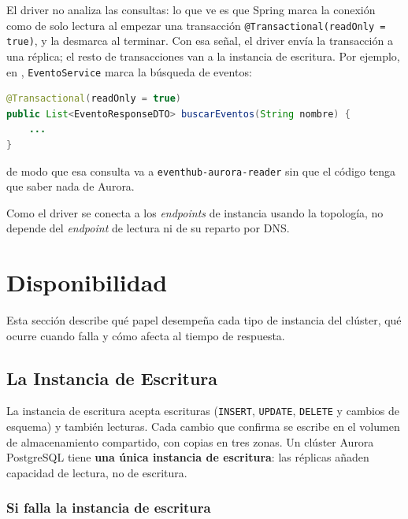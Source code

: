 \documentclass[12pt,a4paper]{article}
\begin{document}
El driver no analiza las consultas: lo que ve es que Spring marca la conexión como de solo lectura al empezar una transacción \texttt{@Transactional(readOnly = true)}, y la desmarca al terminar. Con esa señal, el driver envía la transacción a una réplica; el resto de transacciones van a la instancia de escritura. Por ejemplo, en \proyecto, \texttt{EventoService} marca la búsqueda de eventos:

\begin{lstlisting}[language=Java,basicstyle=\ttfamily\footnotesize]
@Transactional(readOnly = true)
public List<EventoResponseDTO> buscarEventos(String nombre) {
    ...
}
\end{lstlisting}

\vspace{1em}

\noindent de modo que esa consulta va a \texttt{eventhub-aurora-reader} sin que el código tenga que saber nada de Aurora.

Como el driver se conecta a los \textit{endpoints} de instancia usando la topología, no depende del \textit{endpoint} de lectura ni de su reparto por DNS.

\section{Disponibilidad}\label{sec:disponibilidad}

Esta sección describe qué papel desempeña cada tipo de instancia del clúster, qué ocurre cuando falla y cómo afecta al tiempo de respuesta.

\subsection{La Instancia de Escritura}\label{sec:writer}

La instancia de escritura acepta escrituras (\texttt{INSERT}, \texttt{UPDATE}, \texttt{DELETE} y cambios de esquema) y también lecturas. Cada cambio que confirma se escribe en el volumen de almacenamiento compartido, con copias en tres zonas. Un clúster Aurora PostgreSQL tiene \textbf{una única instancia de escritura}: las réplicas añaden capacidad de lectura, no de escritura.

\subsubsection{Si falla la instancia de escritura}
\end{document}
